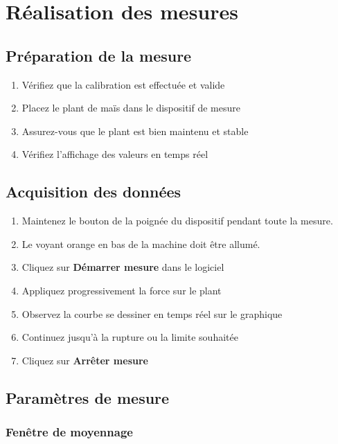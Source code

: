 \documentclass[12pt,a4paper]{article}
\begin{document}
\section{Réalisation des mesures}

\subsection{Préparation de la mesure}

\begin{enumerate}
    \item Vérifiez que la calibration est effectuée et valide
    \item Placez le plant de maïs dans le dispositif de mesure
    \item Assurez-vous que le plant est bien maintenu et stable
    \item Vérifiez l'affichage des valeurs en temps réel
\end{enumerate}

\subsection{Acquisition des données}

\begin{enumerate}
    \item Maintenez le bouton de la poignée du dispositif pendant toute la mesure.
    \item Le voyant orange en bas de la machine doit être allumé.
    \item Cliquez sur \textbf{Démarrer mesure} dans le logiciel
    \item Appliquez progressivement la force sur le plant
    \item Observez la courbe se dessiner en temps réel sur le graphique
    
    \item Continuez jusqu'à la rupture ou la limite souhaitée
    \item Cliquez sur \textbf{Arrêter mesure}
\end{enumerate}

\subsection{Paramètres de mesure}

\subsubsection{Fenêtre de moyennage}
\end{document}
